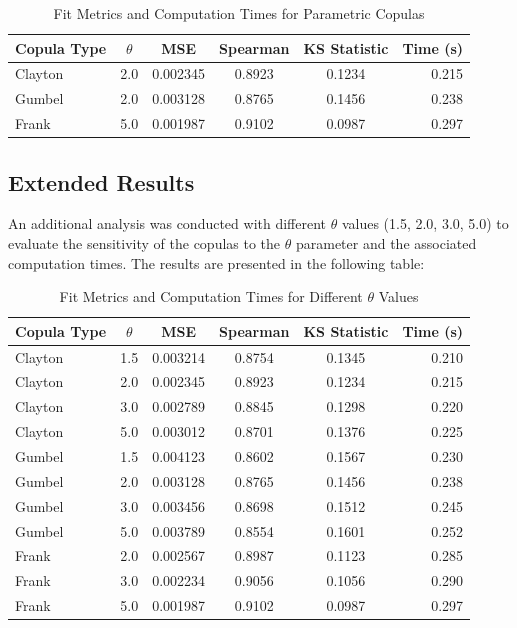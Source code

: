 \documentclass[
	11pt, %
	fleqn, %
	a4paper, %
]{LegrandOrangeBook}
\begin{document}
\begin{table}[htbp]
\centering
\caption{Fit Metrics and Computation Times for Parametric Copulas}
\label{tab:copulasresults}
\begin{tabular}{@{}lccccr@{}}
\toprule
\textbf{Copula Type} & \textbf{$\theta$} & \textbf{MSE} & \textbf{Spearman} & \textbf{KS Statistic} & \textbf{Time (s)} \\
\midrule
Clayton & 2.0 & 0.002345 & 0.8923 & 0.1234 & 0.215 \\
Gumbel & 2.0 & 0.003128 & 0.8765 & 0.1456 & 0.238 \\
Frank & 5.0 & 0.001987 & 0.9102 & 0.0987 & 0.297 \\
\bottomrule
\end{tabular}
\end{table}

\subsection{Extended Results}
An additional analysis was conducted with different $\theta$ values (1.5, 2.0, 3.0, 5.0) to evaluate the sensitivity of the copulas to the $\theta$ parameter and the associated computation times. The results are presented in the following table:

\begin{table}[htbp]
\centering
\caption{Fit Metrics and Computation Times for Different $\theta$ Values}
\label{tab:extendedresults}
\begin{tabular}{@{}lccccr@{}}
\toprule
\textbf{Copula Type} & \textbf{$\theta$} & \textbf{MSE} & \textbf{Spearman} & \textbf{KS Statistic} & \textbf{Time (s)} \\
\midrule
Clayton & 1.5 & 0.003214 & 0.8754 & 0.1345 & 0.210 \\
Clayton & 2.0 & 0.002345 & 0.8923 & 0.1234 & 0.215 \\
Clayton & 3.0 & 0.002789 & 0.8845 & 0.1298 & 0.220 \\
Clayton & 5.0 & 0.003012 & 0.8701 & 0.1376 & 0.225 \\
Gumbel & 1.5 & 0.004123 & 0.8602 & 0.1567 & 0.230 \\
Gumbel & 2.0 & 0.003128 & 0.8765 & 0.1456 & 0.238 \\
Gumbel & 3.0 & 0.003456 & 0.8698 & 0.1512 & 0.245 \\
Gumbel & 5.0 & 0.003789 & 0.8554 & 0.1601 & 0.252 \\
Frank & 2.0 & 0.002567 & 0.8987 & 0.1123 & 0.285 \\
Frank & 3.0 & 0.002234 & 0.9056 & 0.1056 & 0.290 \\
Frank & 5.0 & 0.001987 & 0.9102 & 0.0987 & 0.297 \\
\bottomrule
\end{tabular}
\end{table}
\end{document}
